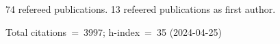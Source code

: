 74 refereed publications. 13 refeered publications as first author.

Total citations~=~3997; h-index~=~35 (2024-04-25)